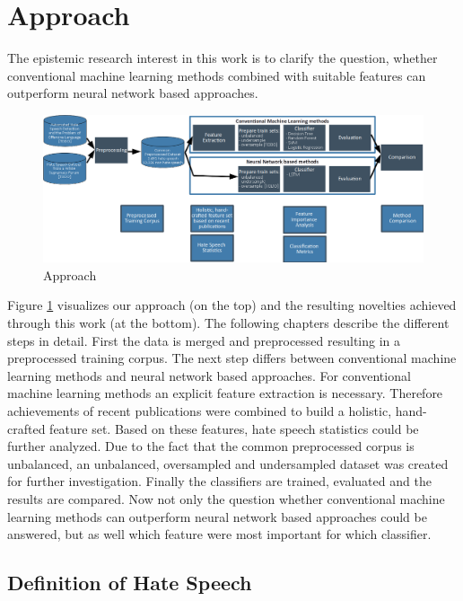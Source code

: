 \section{Approach} 
\label{approach}

The epistemic research interest in this work is to clarify the question, whether conventional machine learning methods combined with suitable features can outperform neural network based approaches.

\begin{figure}[ht]
	\centering
	\includegraphics[width=1.0\linewidth]{figures/pipeline.png}
	\caption{Approach}
	\label{fig:overall_pipeline}
\end{figure}

Figure \ref{fig:overall_pipeline} visualizes our approach (on the top) and the resulting novelties achieved through this work (at the bottom). The following chapters describe the different steps in detail. First the data is merged and preprocessed resulting in a preprocessed training corpus. The next step differs between conventional machine learning methods and neural network based approaches. For conventional machine learning methods an explicit feature extraction is necessary. Therefore achievements of recent publications were combined to build a holistic, hand-crafted feature set. Based on these features, hate speech statistics could be further analyzed. Due to the fact that the common preprocessed corpus is unbalanced, an unbalanced, oversampled and undersampled dataset was created for further investigation. Finally the classifiers are trained, evaluated and the results are compared. Now not only the question whether conventional machine learning methods can outperform neural network based approaches could be answered, but as well which feature were most important for which classifier.

\subsection{Definition of Hate Speech} 
\label{ch:approachA}


